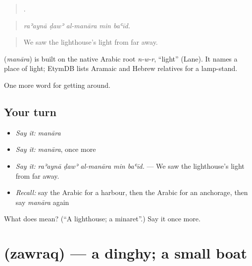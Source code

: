 \begin{quote}
    .
\end{quote}

\begin{quote}
\emph{raʾaynā ḍawʾ al-manāra min baʿīd.}
\end{quote}

\begin{quote}
We saw the lighthouse's light from far away.
\end{quote}

\begin{cousinweb}
\textbf{} (\emph{manāra}) is built on the native Arabic root \emph{n-w-r}, \textquotedblleft{}light\textquotedblright{} (Lane). It names a place of light; EtymDB lists Aramaic and Hebrew relatives for a lamp-stand.
\end{cousinweb}

\begin{grammarlens}[title={What you've built}]
One more word for getting around.
\end{grammarlens}

\subsection*{Your turn}
\begin{itemize}
\raggedright
  \item \emph{Say it:} \emph{manāra}
  \item \emph{Say it:} \emph{manāra}, once more
  \item \emph{Say it:} \emph{raʾaynā ḍawʾ al-manāra min baʿīd.} — We saw the lighthouse's light from far away.
  \item \emph{Recall:} say the Arabic for a harbour, then the Arabic for an anchorage, then say \emph{manāra} again
\end{itemize}

\begin{tcolorbox}[breakable,colback=teal!4,colframe=teal!35!black,title={Before you move on}]
What does  mean? (\textquotedblleft{}A lighthouse; a minaret\textquotedblright{}.) Say it once more.
\end{tcolorbox}
\section[\texorpdfstring{\ar{زورق} (zawraq)}{زورق (zawraq)}]{ (zawraq) — a dinghy; a small boat}

